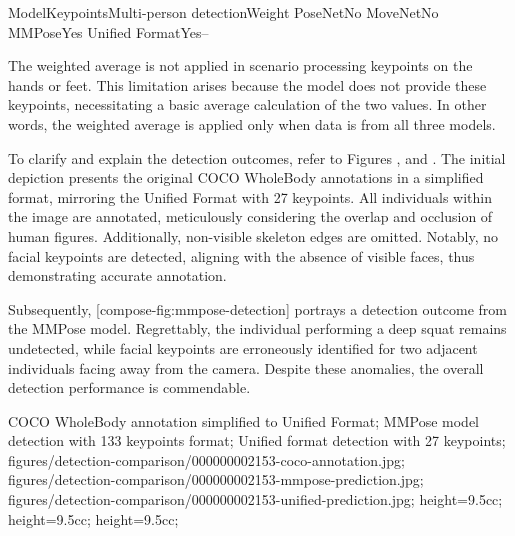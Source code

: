  \setupTABLE[r][1][style=bold]
 \setupTABLE[c][each][offset=3dd]
 \setupTABLE[frame=off]
 \setupTABLE[r][1][topframe=on,bottomframe=on]
 \setupTABLE[r][5][bottomframe=on]
 \setupTABLE[c][each][leftframe=on]
 \setupTABLE[c][1][leftframe=off]
 \setupTABLE[c][2,3,4][align=middle]
 \bTR\bTD Model\eTD\bTD Keypoints\eTD\bTD Multi-person detection\eTD\bTD Weight\eTD\eTR
 \bTR\bTD PoseNet\eTD{}\eTD\bTD No\eTD{}\eTD\eTR
 \bTR\bTD MoveNet\eTD{}\eTD\bTD No\eTD{}\eTD\eTR
 \bTR\bTD MMPose\eTD{}\eTD\bTD Yes\eTD{}\eTD\eTR
 \bTR\bTD Unified Format\eTD{}\eTD\bTD Yes\eTD\bTD --\eTD\eTR


The weighted average is not applied in scenario processing keypoints on the hands or feet. This limitation arises because the  model does not provide these keypoints, necessitating a basic average calculation of the two values. In other words, the weighted average is applied only when data is from all three models.

To clarify and explain the detection outcomes, refer to Figures ,  and . The initial depiction presents the original COCO WholeBody annotations in a simplified format, mirroring the Unified Format with 27 keypoints. All individuals within the image are annotated, meticulously considering the overlap and occlusion of human figures. Additionally, non-visible skeleton edges are omitted. Notably, no facial keypoints are detected, aligning with the absence of visible faces, thus demonstrating accurate annotation.

Subsequently, [compose-fig:mmpose-detection] portrays a detection outcome from the MMPose model. Regrettably, the individual performing a deep squat remains undetected, while facial keypoints are erroneously identified for two adjacent individuals facing away from the camera. Despite these anomalies, the overall detection performance is commendable.

 {
 COCO WholeBody annotation simplified to Unified Format;
 MMPose model detection with 133 keypoints format;
 Unified format detection with 27 keypoints;
 }
 {
 figures/detection-comparison/000000002153-coco-annotation.jpg;
 figures/detection-comparison/000000002153-mmpose-prediction.jpg;
 figures/detection-comparison/000000002153-unified-prediction.jpg;
 }
 {
 height=9.5cc;
 height=9.5cc;
 height=9.5cc;
 }


